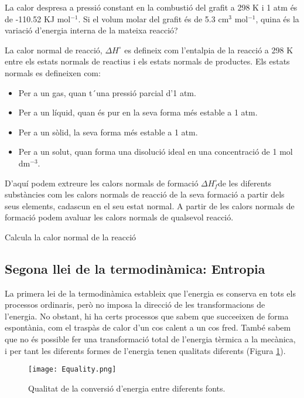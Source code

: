 \begin{exr}
La calor despresa a pressió constant en la combustió del grafit a 298 K i 1 atm és de -110.52 KJ mol$^{-1}$. Si el volum molar del grafit és de 5.3 cm$^3$ mol$^{-1}$, quina és la variació d'energia interna de la mateixa reacció?
\end{exr}

La calor normal de reacció, $\Delta H^{\circ}$ es defineix com l'entalpia de la reacció a 298 K entre els estats normals de reactius i els estats normals de productes.
Els estats normals es defineixen com:
\begin{itemize}
\item Per a un gas, quan t´una pressió parcial d'1 atm.
\item Per a un líquid, quan és pur en la seva forma més estable a 1 atm.
\item Per a un sòlid, la seva forma més estable a 1 atm.
\item Per a un solut, quan forma una disolució ideal en una concentració de 1 mol dm$^{-3}$.
\end{itemize}
D'aquí podem extreure les calors normals de formació $\Delta H_f^{\circ}$de les diferents substàncies com les calors normals de reacció de la seva formació a partir dels seus elements, cadascun en el seu estat normal.
A partir de les calors normals de formació podem avaluar les calors normals de qualsevol reacció.
\begin{exr}
Calcula la calor normal de la reacció 
\end{exr}

\subsection{Segona llei de la termodinàmica: Entropia}

La primera lei de la termodinàmica estableix que l'energia es conserva en tots els processos ordinaris, però no imposa la direcció de les transformacions de l'energia.
No obstant, hi ha certs processos que sabem que succeeixen de forma espontània, com el traspàs de calor d'un cos calent a un cos fred.
També sabem que no és possible fer una transformació total de l'energia tèrmica a la mecànica, i per tant les diferents formes de l'energia tenen qualitats diferents (Figura \ref{fig:Equality}).
\begin{figure}[h]
\centering
\texttt{[image: Equality.png]}
\caption{Qualitat de la conversió d'energia entre diferents fonts.\cite{yen_chemistry_2008}}
\label{fig:Equality}
\end{figure}

